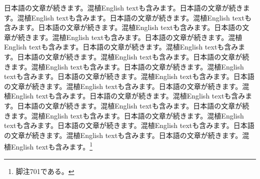 \documentclass[pdflatex,book]{jlreq}
\begin{document}
日本語の文章が続きます。混植English textも含みます。日本語の文章が続きます。混植English textも含みます。日本語の文章が続きます。混植English textも含みます。日本語の文章が続きます。混植English textも含みます。日本語の文章が続きます。混植English textも含みます。日本語の文章が続きます。混植English textも含みます。日本語の文章が続きます。混植English textも含みます。日本語の文章が続きます。混植English textも含みます。日本語の文章が続きます。混植English textも含みます。日本語の文章が続きます。混植English textも含みます。日本語の文章が続きます。混植English textも含みます。日本語の文章が続きます。混植English textも含みます。日本語の文章が続きます。混植English textも含みます。日本語の文章が続きます。混植English textも含みます。日本語の文章が続きます。混植English textも含みます。日本語の文章が続きます。混植English textも含みます。日本語の文章が続きます。混植English textも含みます。日本語の文章が続きます。混植English textも含みます。日本語の文章が続きます。混植English textも含みます。日本語の文章が続きます。混植English textも含みます。\footnote{脚注701である。}
\end{document}
